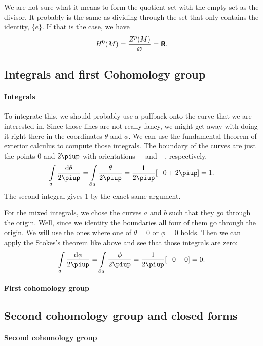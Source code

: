 \documentclass[11pt, english, fleqn, DIV=15, headinclude, BCOR=1cm]{scrartcl}
\begin{document}
We are not sure what it means to form the quotient set with the empty set as
the divisor. It probably is the same as dividing through the set that only
contains the identity, $\{ e \}$. If that is the case, we have
\[
    H^0(M) = \frac{Z^p(M)}{\varnothing} = \text{\bfseries\sffamily R}.
\]

\subsection{Integrals and first Cohomology group}

\paragraph{Integrals}

To integrate this, we should probably use a pullback onto the curve that we are
interested in. Since those lines are not really fancy, we might get away with
doing it right there in the coordinates $\theta$ and $\phi$. We can use the
fundamental theorem of exterior calculus to compute those integrals. The
boundary of the curves are just the points 0 and $2\piup$ with orientations
$-$ and $+$, respectively.
\[
    \intop_a \frac{\dif \theta}{2\piup}
    = \intop_{\partial a} \frac{\theta}{2\piup}
    = \frac{1}{2\piup} [-0 + 2\piup] = 1.
\]
The second integral gives 1 by the exact same argument.

For the mixed integrals, we chose the curves $a$ and $b$ such that they go
through the origin. Well, since we identity the boundaries all four of them go
through the origin. We will use the ones where one of $\theta = 0$ or $\phi =
0$ holds. Then we can apply the Stokes's theorem like above and see that those
integrals are zero:
\[
    \intop_a \frac{\dif \phi}{2\piup}
    = \intop_{\partial a} \frac{\phi}{2\piup}
    = \frac{1}{2\piup} [-0 + 0] = 0.
\]

\paragraph{First cohomology group}

\subsection{Second cohomology group and closed forms}

\paragraph{Second cohomology group}
\end{document}
